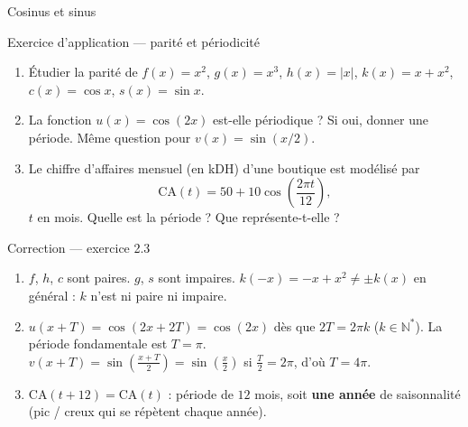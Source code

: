 \documentclass[aspectratio=169,11pt]{beamer}
\newcommand{\N}{\mathbb{N}}
\newcommand{\key}[1]{\textbf{\color{DarkBlue}#1}}
\begin{document}
\begin{frame}{Cosinus et sinus}
	\centering
\end{frame}

\begin{frame}{Exercice d'application --- parité et périodicité}
	\begin{exercicebox}[Exercice 2.3]
		\begin{enumerate}
			\item Étudier la parité de
			$f(x)=x^2$, $g(x)=x^3$, $h(x)=\lvert x\rvert$, $k(x)=x+x^2$,
			$c(x)=\cos x$, $s(x)=\sin x$.
			\item La fonction $u(x)=\cos(2x)$ est-elle périodique ? Si oui, donner une période.
			Même question pour $v(x)=\sin(x/2)$.
			\item Le chiffre d'affaires mensuel (en kDH) d'une boutique est modélisé par
			\[
				\mathrm{CA}(t)=50+10\cos\!\left(\frac{2\pi t}{12}\right),
			\]
			$t$ en mois. Quelle est la période ? Que représente-t-elle ?
		\end{enumerate}
	\end{exercicebox}
\end{frame}

\begin{frame}{Correction --- exercice 2.3}
	\begin{definitionbox}[Correction]\small
		\begin{enumerate}
			\item $f$, $h$, $c$ sont paires. $g$, $s$ sont impaires.
			$k(-x)=-x+x^2\neq \pm k(x)$ en général : $k$ n'est ni paire ni impaire.
			\item $u(x+T)=\cos(2x+2T)=\cos(2x)$ dès que $2T=2\pi k$ ($k\in\N^\ast$).
			La période fondamentale est $T=\pi$.\\
			$v(x+T)=\sin(\frac{x+T}{2})=\sin(\frac{x}{2})$ si $\frac{T}{2}=2\pi$, d'où $T=4\pi$.
			\item $\mathrm{CA}(t+12)=\mathrm{CA}(t)$ : période de $12$ mois, soit
			\key{une année} de saisonnalité (pic / creux qui se répètent chaque année).
		\end{enumerate}
	\end{definitionbox}
\end{frame}
\end{document}
